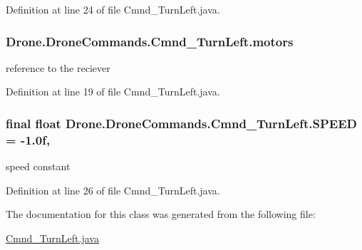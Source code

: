 Definition at line 24 of file Cmnd\+\_\+\+Turn\+Left.\+java.

\hypertarget{class_drone_1_1_drone_commands_1_1_cmnd___turn_left_a827f219ec9b297ac00291f9a45585b9e}{}
\subsubsection[{motors}]{ Drone.\+Drone\+Commands.\+Cmnd\+\_\+\+Turn\+Left.\+motors\hspace{0.3cm}{\ttfamily [private]}}\label{class_drone_1_1_drone_commands_1_1_cmnd___turn_left_a827f219ec9b297ac00291f9a45585b9e}
reference to the reciever 

Definition at line 19 of file Cmnd\+\_\+\+Turn\+Left.\+java.

\hypertarget{class_drone_1_1_drone_commands_1_1_cmnd___turn_left_a1d83061bcca66aba8fb5e95296369786}{}
\subsubsection[{S\+P\+E\+E\+D}]{\setlength{\rightskip}{0pt plus 5cm}final float Drone.\+Drone\+Commands.\+Cmnd\+\_\+\+Turn\+Left.\+S\+P\+E\+E\+D = -\/1.\+0f\hspace{0.3cm}{\ttfamily [static]}, {\ttfamily [private]}}\label{class_drone_1_1_drone_commands_1_1_cmnd___turn_left_a1d83061bcca66aba8fb5e95296369786}
speed constant 

Definition at line 26 of file Cmnd\+\_\+\+Turn\+Left.\+java.



The documentation for this class was generated from the following file\+:\begin{DoxyCompactItemize}
\item 
\hyperlink{_cmnd___turn_left_8java}{Cmnd\+\_\+\+Turn\+Left.\+java}\end{DoxyCompactItemize}
